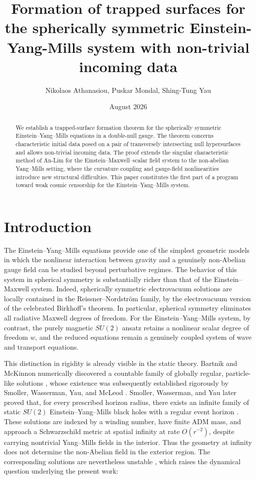 \documentclass{article}[11pt]
\title{Formation of trapped surfaces for the spherically symmetric Einstein-Yang-Mills system with non-trivial incoming data }
\author{Nikolaos Athanasiou, Puskar Mondal, Shing-Tung Yau}
\date{August 2026}
\numberwithin{equation}{section}
\begin{document}
\maketitle
\begin{abstract}
\noindent We establish a trapped-surface formation theorem for the spherically symmetric Einstein--Yang--Mills equations in a double-null gauge. The theorem concerns characteristic initial data posed on a pair of transversely intersecting null hypersurfaces and allows non-trivial incoming data. The proof extends the singular characteristic method of An-Lim \cite{AnLim} for the Einstein--Maxwell--scalar field system to the non-abelian Yang--Mills setting, where the curvature coupling and gauge-field nonlinearities introduce new structural difficulties. This paper constitutes the first part of a program toward weak cosmic censorship for the Einstein--Yang--Mills system.  
\end{abstract}

\section{Introduction}

\indent The Einstein--Yang--Mills equations provide one of the simplest geometric
models in which the nonlinear interaction between gravity and a genuinely
non-Abelian gauge field can be studied beyond perturbative regimes. The behavior of this system in spherical symmetry is substantially richer than that of
the Einstein--Maxwell system. Indeed, spherically symmetric electrovacuum
solutions are locally contained in the Reissner--Nordstr\"om family, by the
electrovacuum version of the celebrated Birkhoff's theorem.  In particular,
spherical symmetry eliminates all radiative Maxwell degrees of freedom.
For the Einstein--Yang--Mills system, by contrast, the purely magnetic
\(SU(2)\) ansatz retains a nonlinear scalar degree of freedom \(w\), and
the reduced equations remain a genuinely coupled system of wave and
transport equations.

This distinction in rigidity is already visible in the static theory. Bartnik and
McKinnon numerically discovered a countable family of globally regular,
particle-like solutions \cite{bartnik1988particlelike}, whose existence was
subsequently established rigorously by Smoller, Wasserman, Yau, and McLeod
\cite{smoller1991smooth}. Smoller, Wasserman, and Yau later proved that, for
every prescribed horizon radius, there exists an infinite family of static
\(SU(2)\) Einstein--Yang--Mills black holes with a regular event horizon
\cite{smoller1993existence}. These solutions are indexed by a winding
number, have finite ADM mass, and approach a Schwarzschild metric at
spatial infinity at rate \(O(r^{-2})\), despite carrying nontrivial
Yang--Mills fields in the interior. Thus the geometry at infinity does not
determine the non-Abelian field in the exterior region. The corresponding
solutions are nevertheless unstable \cite{straumann1990instability}, which
raises the dynamical question underlying the present work:
\end{document}

